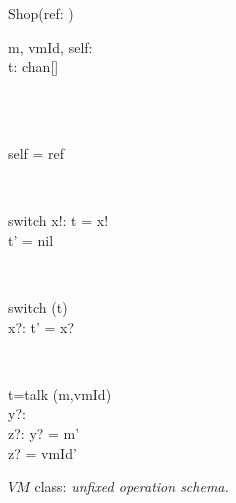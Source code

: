 \begin{figure}[H]
\centering
\begin{class}{Shop(ref: \integer)}
\\
\begin{state}
m, vmId, self: \integer
\\t: chan[\integer \times \integer]
\end{state} 
\\
\begin{init}
\\self = ref
\end{init} 
\\
\begin{op}{switch}
x!: \integer
\ST
t = x!
\\t' = nil
\end{op}
\\
\begin{op}{switch}
\Delta (t)
\\x?: \integer
\ST
t' = x?
\end{op}
\\
\begin{op}{t=talk}
\Delta (m,vmId)
\\y?: \integer
\\z?: \integer
\ST
y? = m'
\\z? = vmId'
\end{op}
\end{class}
\caption{$VM$ class: \textit{unfixed operation schema.}}
\label{oz_unfixed_operation_schema_shop}
\end{figure}